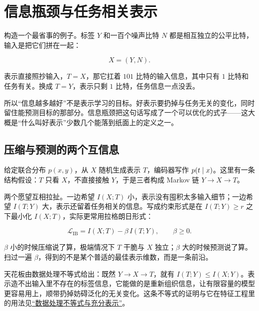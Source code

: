 \section{信息瓶颈与任务相关表示}
\label{sec:07-Information-Theory/06-Information-and-Learning/03}

构造一个最省事的例子。标签 \(Y\) 和一百个噪声比特 \(N\) 都是相互独立的公平比特，输入是把它们拼在一起：

\[
X=(Y,N).
\]

表示直接照抄输入，\(T=X\)，那它扛着 \(101\) 比特的输入信息，其中只有 \(1\) 比特和任务有关。换成 \(T=Y\)，表示只剩 \(1\) 比特，任务信息一点没丢。

所以``信息越多越好''不是表示学习的目标。好表示要扔掉与任务无关的变化，同时留住能预测目标的那部分。信息瓶颈把这句话写成了一个可以优化的式子——这大概是``什么叫好表示''少数几个能落到纸面上的定义之一。

\subsection{压缩与预测的两个互信息}

给定联合分布 \(p(x,y)\)，从 \(X\) 随机生成表示 \(T\)，编码器写作 \(p(t\mid x)\)。这里有一条结构假设：\(T\) 只看 \(X\)，不直接接触 \(Y\)，于是三者构成 Markov 链 \(Y\to X\to T\)。

两个愿望互相拉扯。一边希望 \(I(X;T)\) 小，表示没有囤积太多输入细节；一边希望 \(I(T;Y)\) 大，表示还留着任务相关的信息。写成约束形式是在 \(I(T;Y)\ge r\) 之下最小化 \(I(X;T)\)，实际更常用拉格朗日形式：

\[
\mathcal L_{\mathrm{IB}}=I(X;T)-\beta\,I(T;Y),\qquad \beta\ge 0.
\]

\(\beta\) 小的时候压缩说了算，极端情况下 \(T\) 干脆与 \(X\) 独立；\(\beta\) 大的时候预测说了算。扫过一遍 \(\beta\)，得到的不是某个普适的最佳表示维数，而是一条前沿。

天花板由数据处理不等式给出：既然 \(Y\to X\to T\)，就有 \(I(T;Y)\le I(X;Y)\)。表示造不出输入里不存在的标签信息，它能做的是重新组织信息，让有限容量的模型更容易用上，顺带扔掉妨碍泛化的无关变化。这条不等式的证明与它在特征工程里的用法见\hyperref[sec:07-Information-Theory/02-Joint-Information/04]{``数据处理不等式与充分表示''}。

